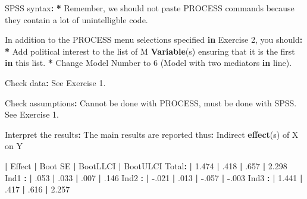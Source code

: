 \documentclass[a4paper]{book}
\newenvironment{Shaded}{\begin{snugshade}}{\end{snugshade}}
\newcommand{\KeywordTok}[1]{\textcolor[rgb]{0,0,0}{\textbf{#1}}}
\newcommand{\DecValTok}[1]{\textcolor[rgb]{0.00,0.00,0.00}{#1}}
\newcommand{\FloatTok}[1]{\textcolor[rgb]{0.00,0.00,0.00}{#1}}
\newcommand{\StringTok}[1]{\textcolor[rgb]{0.00,0.00,0.00}{#1}}
\newcommand{\ControlFlowTok}[1]{\textcolor[rgb]{0.00,0.00,0.00}{\textbf{#1}}}
\newcommand{\OperatorTok}[1]{\textcolor[rgb]{0.00,0.00,0.00}{\textbf{#1}}}
\newcommand{\ErrorTok}[1]{\textcolor[rgb]{0.00,0.00,0.00}{\textbf{#1}}}
\newcommand{\NormalTok}[1]{#1}
\theoremstyle{definition}
\theoremstyle{definition}
\theoremstyle{definition}
\theoremstyle{remark}
\begin{document}
\begin{Shaded}
\begin{Highlighting}[]
\NormalTok{SPSS syntax}\OperatorTok{:}\StringTok{  }
\StringTok{  }
\ErrorTok{*}\StringTok{ }\NormalTok{Remember, we should not paste PROCESS commands because they contain a lot of}
\NormalTok{unintelligble code.}
  
\NormalTok{In addition to the PROCESS menu selections specified }\ControlFlowTok{in}\NormalTok{ Exercise }\DecValTok{2}\NormalTok{, you should}\OperatorTok{:}\StringTok{  }
\StringTok{    }
\ErrorTok{*}\StringTok{ }\NormalTok{Add political interest to the list of M }\KeywordTok{Variable}\NormalTok{(s) ensuring that it is the}
\NormalTok{first }\ControlFlowTok{in}\NormalTok{ this list.}
\OperatorTok{*}\StringTok{ }\NormalTok{Change Model Number to }\DecValTok{6}\NormalTok{ (Model with two mediators }\ControlFlowTok{in}\NormalTok{ line).  }
  
\NormalTok{Check data}\OperatorTok{:}\StringTok{ }\NormalTok{See Exercise }\DecValTok{1}\NormalTok{.  }
  
\NormalTok{Check assumptions}\OperatorTok{:}\StringTok{ }\NormalTok{Cannot be done with PROCESS, must be done with SPSS. See}
\NormalTok{Exercise }\DecValTok{1}\NormalTok{.}
  
\NormalTok{Interpret the results}\OperatorTok{:}\StringTok{  }
\StringTok{  }
\NormalTok{The main results are reported thus}\OperatorTok{:}\StringTok{  }
\StringTok{  }
\NormalTok{Indirect }\KeywordTok{effect}\NormalTok{(s) of X on Y   }
  
        \OperatorTok{|}\StringTok{  }\NormalTok{Effect  }\OperatorTok{|}\StringTok{  }\NormalTok{Boot SE  }\OperatorTok{|}\StringTok{  }\NormalTok{BootLLCI  }\OperatorTok{|}\StringTok{  }\NormalTok{BootULCI  }
\NormalTok{Total}\OperatorTok{:}\StringTok{  }\ErrorTok{|}\StringTok{  }\FloatTok{1.474}   \OperatorTok{|}\StringTok{  }\NormalTok{.}\DecValTok{418}     \OperatorTok{|}\StringTok{  }\NormalTok{.}\DecValTok{657}      \OperatorTok{|}\StringTok{  }\FloatTok{2.298}  
\NormalTok{Ind1 }\OperatorTok{:}\StringTok{  }\ErrorTok{|}\StringTok{  }\NormalTok{.}\DecValTok{053}    \OperatorTok{|}\StringTok{  }\NormalTok{.}\DecValTok{033}     \OperatorTok{|}\StringTok{  }\NormalTok{.}\DecValTok{007}      \OperatorTok{|}\StringTok{  }\NormalTok{.}\DecValTok{146}  
\NormalTok{Ind2 }\OperatorTok{:}\StringTok{  }\ErrorTok{|}\StringTok{  }\OperatorTok{-}\NormalTok{.}\DecValTok{021}   \OperatorTok{|}\StringTok{  }\NormalTok{.}\DecValTok{013}     \OperatorTok{|}\StringTok{  }\OperatorTok{-}\NormalTok{.}\DecValTok{057}     \OperatorTok{|}\StringTok{  }\OperatorTok{-}\NormalTok{.}\DecValTok{003}  
\NormalTok{Ind3 }\OperatorTok{:}\StringTok{  }\ErrorTok{|}\StringTok{  }\FloatTok{1.441}   \OperatorTok{|}\StringTok{  }\NormalTok{.}\DecValTok{417}     \OperatorTok{|}\StringTok{  }\NormalTok{.}\DecValTok{616}      \OperatorTok{|}\StringTok{  }\FloatTok{2.257}  


\end{Highlighting}
\end{Shaded}
\end{document}
